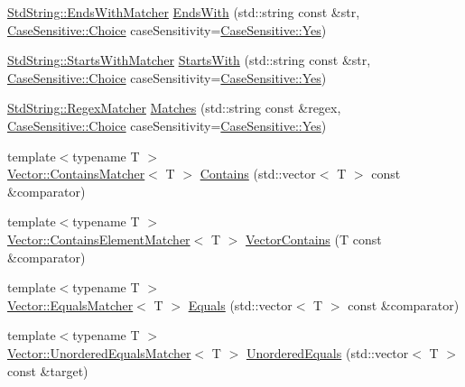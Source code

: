 \begin{DoxyCompactItemize}
\item 
\hyperlink{struct_catch_1_1_matchers_1_1_std_string_1_1_ends_with_matcher}{Std\-String\-::\-Ends\-With\-Matcher} \hyperlink{namespace_catch_1_1_matchers_ae5a45efb4538c57c43e04f3f9043ad6e}{Ends\-With} (std\-::string const \&str, \hyperlink{struct_catch_1_1_case_sensitive_aad49d3aee2d97066642fffa919685c6a}{Case\-Sensitive\-::\-Choice} case\-Sensitivity=\hyperlink{struct_catch_1_1_case_sensitive_aad49d3aee2d97066642fffa919685c6aa7c5550b69ec3c502e6f609b67f9613c6}{Case\-Sensitive\-::\-Yes})
\item 
\hyperlink{struct_catch_1_1_matchers_1_1_std_string_1_1_starts_with_matcher}{Std\-String\-::\-Starts\-With\-Matcher} \hyperlink{namespace_catch_1_1_matchers_a97c9ee09a70378ca7e8c6f9f01b0d6d1}{Starts\-With} (std\-::string const \&str, \hyperlink{struct_catch_1_1_case_sensitive_aad49d3aee2d97066642fffa919685c6a}{Case\-Sensitive\-::\-Choice} case\-Sensitivity=\hyperlink{struct_catch_1_1_case_sensitive_aad49d3aee2d97066642fffa919685c6aa7c5550b69ec3c502e6f609b67f9613c6}{Case\-Sensitive\-::\-Yes})
\item 
\hyperlink{struct_catch_1_1_matchers_1_1_std_string_1_1_regex_matcher}{Std\-String\-::\-Regex\-Matcher} \hyperlink{namespace_catch_1_1_matchers_a82f1893cf50ae4c14b9b3e0980bf22b8}{Matches} (std\-::string const \&regex, \hyperlink{struct_catch_1_1_case_sensitive_aad49d3aee2d97066642fffa919685c6a}{Case\-Sensitive\-::\-Choice} case\-Sensitivity=\hyperlink{struct_catch_1_1_case_sensitive_aad49d3aee2d97066642fffa919685c6aa7c5550b69ec3c502e6f609b67f9613c6}{Case\-Sensitive\-::\-Yes})
\item 
{\footnotesize template$<$typename T $>$ }\\\hyperlink{struct_catch_1_1_matchers_1_1_vector_1_1_contains_matcher}{Vector\-::\-Contains\-Matcher}$<$ T $>$ \hyperlink{namespace_catch_1_1_matchers_a4b3621740dc515216ad31ab827d4092c}{Contains} (std\-::vector$<$ T $>$ const \&comparator)
\item 
{\footnotesize template$<$typename T $>$ }\\\hyperlink{struct_catch_1_1_matchers_1_1_vector_1_1_contains_element_matcher}{Vector\-::\-Contains\-Element\-Matcher}$<$ T $>$ \hyperlink{namespace_catch_1_1_matchers_ae8db5846328116fb36386893deaec944}{Vector\-Contains} (T const \&comparator)
\item 
{\footnotesize template$<$typename T $>$ }\\\hyperlink{struct_catch_1_1_matchers_1_1_vector_1_1_equals_matcher}{Vector\-::\-Equals\-Matcher}$<$ T $>$ \hyperlink{namespace_catch_1_1_matchers_a332a401fb0da33c988e9cfa400ecce1b}{Equals} (std\-::vector$<$ T $>$ const \&comparator)
\item 
{\footnotesize template$<$typename T $>$ }\\\hyperlink{struct_catch_1_1_matchers_1_1_vector_1_1_unordered_equals_matcher}{Vector\-::\-Unordered\-Equals\-Matcher}$<$ T $>$ \hyperlink{namespace_catch_1_1_matchers_a3eced3a4f580478f4c5e67ed7e2915df}{Unordered\-Equals} (std\-::vector$<$ T $>$ const \&target)
\end{DoxyCompactItemize}



